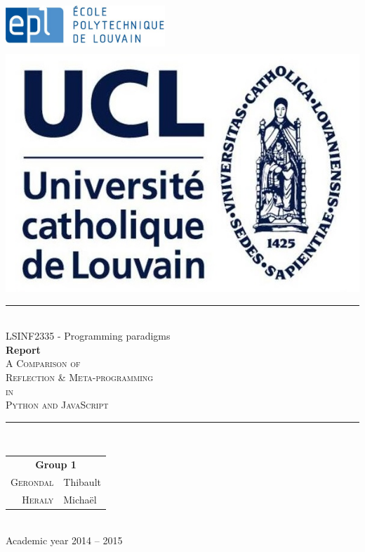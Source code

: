 \documentclass[a4paper,10pt]{article}
\begin{document}

\begin{titlepage}
\newcommand{\HRule}{\rule{\linewidth}{0.5mm}}
\includegraphics[width=6cm,height=1.9cm]{images/Logo_EPL.jpg}
\hfill
\includegraphics[width=3.3 cm,height=2.2 cm]{images/ucl.jpg}

\centering %

\null
\vspace{4 cm}


\HRule \\[0.9cm]

{ {\LARGE LSINF2335 - Programming paradigms}\\[0.4cm]

\huge \textbf{Report} \\[0.6 cm]
{\LARGE \textsc{A Comparison of \\ Reflection \& Meta-programming \\
in \\
Python and JavaScript} }}
\\[0.9cm]
\HRule \\[2cm]

\Large {

\begin{tabular}{rl}
\multicolumn{2}{c}{\textbf{Group 1}}  \\[0.3 cm]
\textsc{Gerondal} & Thibault  \\
\textsc{Heraly } & Michaël \\



\end{tabular}}
\\[1.8cm]



\large{Academic year 2014 -- 2015} %

\end{titlepage}
\end{document}
